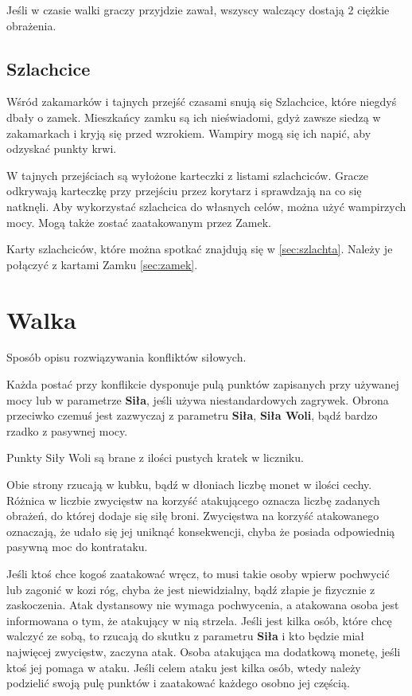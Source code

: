 		Jeśli w czasie walki graczy przyjdzie zawał, wszyscy walczący dostają 2 ciężkie obrażenia.

	\subsection{Szlachcice}
		Wśród zakamarków i tajnych przejść czasami snują się Szlachcice, które niegdyś dbały o zamek.
		Mieszkańcy zamku są ich nieświadomi, gdyż zawsze siedzą w zakamarkach i kryją się przed wzrokiem.
		Wampiry mogą się ich napić, aby odzyskać punkty krwi.
		
		W tajnych przejściach są wyłożone karteczki z listami szlachciców.
		Gracze odkrywają karteczkę przy przejściu przez korytarz i sprawdzają na co się natknęli.
		Aby wykorzystać szlachcica do własnych celów, można użyć wampirzych mocy.
		Mogą także zostać zaatakowanym przez Zamek.
		
		Karty szlachciców, które można spotkać znajdują się w \ref{sec:szlachta}.
		Należy je połączyć z kartami Zamku \ref{sec:zamek}.
		
\section{Walka}
	Sposób opisu rozwiązywania konfliktów siłowych.
	
	Każda postać przy konflikcie dysponuje pulą punktów zapisanych przy używanej mocy lub w parametrze \textbf{Siła}, jeśli używa niestandardowych zagrywek.
	Obrona przeciwko czemuś jest zazwyczaj z parametru \textbf{Siła}, \textbf{Siła Woli}, bądź bardzo rzadko z pasywnej mocy.
	
	Punkty Siły Woli są brane z ilości pustych kratek w liczniku.
	
	Obie strony rzucają w kubku, bądź w dłoniach liczbę monet w ilości cechy.
	Różnica w liczbie zwycięstw na korzyść atakującego oznacza liczbę zadanych obrażeń, do której dodaje się siłę broni.
	Zwycięstwa na korzyść atakowanego oznaczają, że udało się jej uniknąć konsekwencji, chyba że posiada odpowiednią pasywną moc do kontrataku.
	
	Jeśli ktoś chce kogoś zaatakować wręcz, to musi takie osoby wpierw pochwycić lub zagonić w kozi róg, chyba że jest niewidzialny, bądź złapie je fizycznie z zaskoczenia.
	Atak dystansowy nie wymaga pochwycenia, a atakowana osoba jest informowana o tym, że atakujący w nią strzela.
	Jeśli jest kilka osób, które chcę walczyć ze sobą, to rzucają do skutku z parametru \textbf{Siła} i kto będzie miał najwięcej zwycięstw, zaczyna atak.
	Osoba atakująca ma dodatkową monetę, jeśli ktoś jej pomaga w ataku.
	Jeśli celem ataku jest kilka osób, wtedy należy podzielić swoją pulę punktów i zaatakować każdego osobno jej częścią.
	
